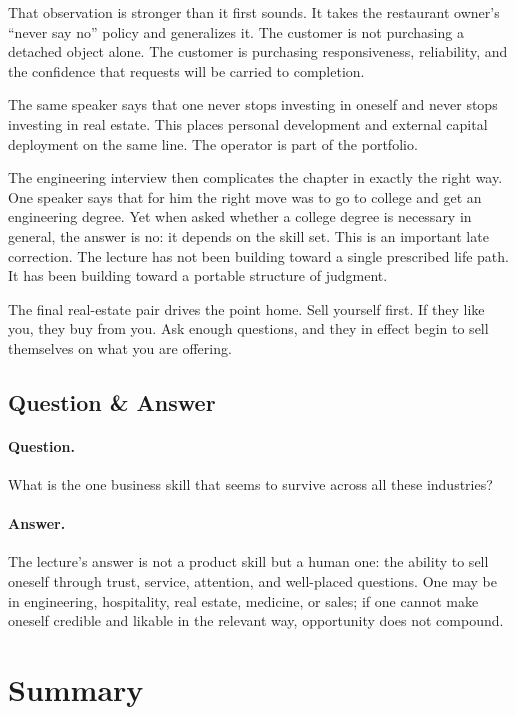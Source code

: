 That observation is stronger than it first sounds. It takes the restaurant owner's ``never say no'' policy and generalizes it. The customer is not purchasing a detached object alone. The customer is purchasing responsiveness, reliability, and the confidence that requests will be carried to completion.

The same speaker says that one never stops investing in oneself and never stops investing in real estate. This places personal development and external capital deployment on the same line. The operator is part of the portfolio.

The engineering interview then complicates the chapter in exactly the right way. One speaker says that for him the right move was to go to college and get an engineering degree. Yet when asked whether a college degree is necessary in general, the answer is no: it depends on the skill set. This is an important late correction. The lecture has not been building toward a single prescribed life path. It has been building toward a portable structure of judgment.

The final real-estate pair drives the point home. Sell yourself first. If they like you, they buy from you. Ask enough questions, and they in effect begin to sell themselves on what you are offering.

\subsection{Question \& Answer}

\paragraph{Question.} What is the one business skill that seems to survive across all these industries?

\paragraph{Answer.} The lecture's answer is not a product skill but a human one: the ability to sell oneself through trust, service, attention, and well-placed questions. One may be in engineering, hospitality, real estate, medicine, or sales; if one cannot make oneself credible and likable in the relevant way, opportunity does not compound.

\section{Summary}

